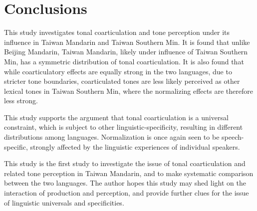 
\chapter{Conclusions}

This study investigates tonal coarticulation and tone perception under its influence in Taiwan Mandarin and Taiwan Southern Min. It is found that unlike Beijing Mandarin, Taiwan Mandarin, likely under influence of Taiwan Southern Min, has a symmetric distribution of tonal coarticulation. It is also found that while coarticulatory effects are equally strong in the two languages, due to stricter tone boundaries, coarticulated tones are less likely perceived as other lexical tones in Taiwan Southern Min, where the normalizing effects are therefore less strong.

This study supports the argument that tonal coarticulation is a universal constraint, which is subject to other linguistic-specificity, resulting in different distributions among languages. Normalization is once again seen to be speech-specific, strongly affected by the linguistic experiences of individual speakers.

This study is the first study to investigate the issue of tonal coarticulation and related tone perception in Taiwan Mandarin, and to make systematic comparison between the two languages. The author hopes this study may shed light on the interaction of production and perception, and provide further clues for the issue of linguistic universals and specificities. 
